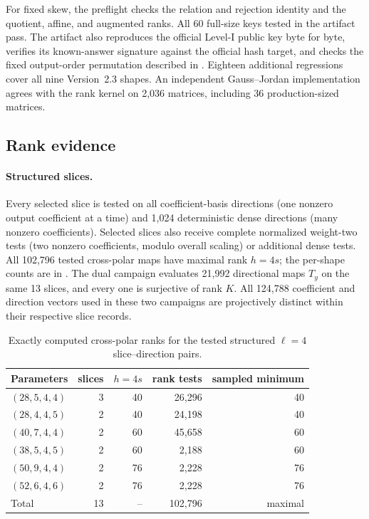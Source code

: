 \documentclass[11pt]{article}
\begin{document}
For fixed skew, the preflight checks the relation and rejection identity and
the quotient, affine, and augmented ranks.  All 60 full-size keys tested in the artifact pass.  The artifact also reproduces the official Level-I public key byte for byte,
verifies its known-answer signature against the official hash target, and
checks the fixed output-order permutation described in
.  Eighteen additional regressions cover all nine
Version~2.3 shapes.  An independent Gauss--Jordan implementation agrees with
the rank kernel on 2,036 matrices, including 36 production-sized matrices.

\subsection{Rank evidence}

\paragraph{Structured slices.}
Every selected slice is tested on all coefficient-basis directions (one
nonzero output coefficient at a time) and 1,024 deterministic dense directions
(many nonzero coefficients).  Selected slices also receive complete normalized
weight-two tests (two nonzero coefficients, modulo overall scaling) or
additional dense tests.  All 102,796 tested
cross-polar maps have maximal rank $h=4s$; the per-shape counts are in
.  The dual campaign evaluates 21,992 directional maps
$T_y$ on the same 13 slices, and every one is surjective of rank $K$.
All 124,788 coefficient and direction vectors used in these two campaigns are
projectively distinct within their respective slice records.

\begin{table}[tbp]
\centering
\caption{Exactly computed cross-polar ranks for the tested structured $\ell=4$ slice--direction pairs.}
\label{tab:cross-polar}
\small
\setlength{\tabcolsep}{5.2pt}
\begin{tabular}{@{}l r r r r@{}}
\toprule
Parameters & slices & $h=4s$ & rank tests & sampled minimum\\
\midrule
$(28,5,4,4)$  & 3 & 40 & 26,296 & 40\\
$(28,4,4,5)$  & 2 & 40 & 24,198 & 40\\
$(40,7,4,4)$  & 2 & 60 & 45,658 & 60\\
$(38,5,4,5)$  & 2 & 60 & 2,188  & 60\\
$(50,9,4,4)$  & 2 & 76 & 2,228  & 76\\
$(52,6,4,6)$  & 2 & 76 & 2,228  & 76\\
\midrule
Total          & 13 & -- & 102,796 & maximal\\
\bottomrule
\end{tabular}
\end{table}
\end{document}
